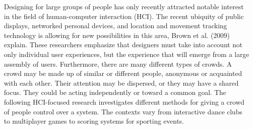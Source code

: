 Designing for large groups of people has only recently attracted notable interest in the field of human-computer interaction (HCI). The recent ubiquity of public displays, networked personal devices, and location and movement tracking technology is allowing for new possibilities in this area, Brown et al. (2009) explain. These researchers emphasize that designers must take into account not only individual user experiences, but the experience that will emerge from a large assembly of users. Furthermore, there are many different types of crowds. A crowd may be made up of similar or different people, anonymous or acquainted with each other. Their attention may be dispersed, or they may have a shared focus. They could be acting independently or toward a common goal. The following HCI-focused research investigates different methods for giving a crowd of people control over a system. The contexts vary from interactive dance clubs to multiplayer games to scoring systems for sporting events.

